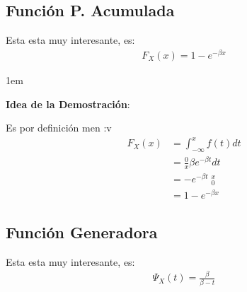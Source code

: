 \documentclass[12pt, fleqn]{report}                             %
\newenvironment{SmallIndentation}[1][0.75em]                    %
        {\begin{adjustwidth}{#1}{}\begin{footnotesize}}             %
        {\end{footnotesize}\end{adjustwidth}}                       %
\theoremstyle{break}                                            %
\DeclareMathOperator \Evaluate  {\Big|}                         %
\begin{document}
            \vspace{1em}
            \subsection{Función P. Acumulada}

                Esta esta muy interesante, es:
                \begin{align*}
                    F_X(x) = 1 - e^{-\beta x}                
                \end{align*}

                \begin{SmallIndentation}[1em]
                    \textbf{Idea de la Demostración}:
                    
                    Es por definición men :v
                    \begin{align*}
                        F_X(x)
                            &= \int_{-\infty}^x f(t) dt                 \\
                            &= \frac{0}{x} \beta e^{-\beta t} dt        \\
                            &= -e^{-\beta t} \Evaluate_0^x              \\
                            &= 1 -e^{-\beta x}
                    \end{align*}
                
                \end{SmallIndentation}


            \clearpage
            \subsection{Función Generadora}

                Esta esta muy interesante, es:
                \begin{align*}
                    \Psi_X(t) = \frac{\beta}{\beta-t}
                \end{align*}
\end{document}

